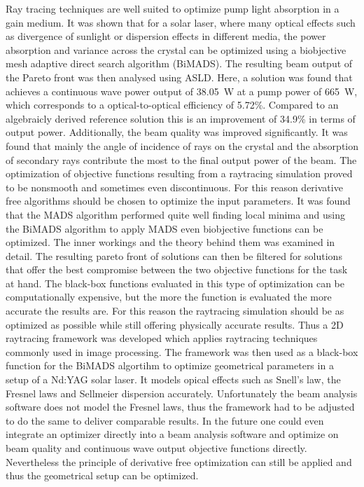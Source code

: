 \documentclass[a4paper,10pt]{article}
\begin{document}
    Ray tracing techniques are well suited to optimize pump light absorption
    in a gain medium.
    It was shown that for a solar laser, where many optical effects such as
    divergence of sunlight or dispersion effects in different media,
    the power absorption and variance across the crystal can be optimized
    using a biobjective mesh adaptive direct search algorithm (BiMADS).
    The resulting beam output of the Pareto front was then analysed using 
    ASLD.
    Here, a solution was found that achieves a continuous wave power output
    of \SI{38.05}{W} at a pump power of \SI{665}{W}, which 
    corresponds to a optical-to-optical efficiency of 5.72\%.
    Compared to an algebraicly derived reference solution this is an
    improvement of 34.9\% in terms of output power.
    Additionally, the beam quality was improved significantly.
    It was found that mainly the angle of incidence of rays on the crystal
    and the absorption of secondary rays contribute the most to the final
    output power of the beam.
    The optimization of objective functions resulting from a raytracing
    simulation proved to be nonsmooth and sometimes even discontinuous.
    For this reason derivative free algorithms should be chosen to
    optimize the input parameters.
    It was found that the MADS algorithm performed quite well finding local
    minima and using the BiMADS algorithm to apply MADS even biobjective
    functions can be optimized.
    The inner workings and the theory behind them was examined in detail.
    The resulting pareto front of solutions can then be filtered for solutions
    that offer the best compromise between the two objective functions for
    the task at hand.
    The black-box functions evaluated in this type of optimization can be
    computationally expensive, but the more the function is evaluated
    the more accurate the results are.
    For this reason the raytracing simulation should be as optimized as
    possible while still offering physically accurate results.
    Thus a 2D raytracing framework was developed which applies raytracing
    techniques commonly used in image processing.
    The framework was then used as a black-box function for the BiMADS algortihm
    to optimize geometrical parameters in a setup of a Nd:YAG solar laser.
    It models opical effects such as Snell's law, the Fresnel laws and
    Sellmeier dispersion accurately.   
    Unfortunately the beam analysis software does not model the Fresnel laws,
    thus the framework had to be adjusted to do the same
    to deliver comparable results.
    In the future one could even integrate an optimizer directly into a 
    beam analysis software and optimize on beam quality and 
    continuous wave output objective functions directly.
    Nevertheless the principle of derivative free optimization can still
    be applied and thus the geometrical setup can be optimized.

    \newpage

    
    
\end{document}
